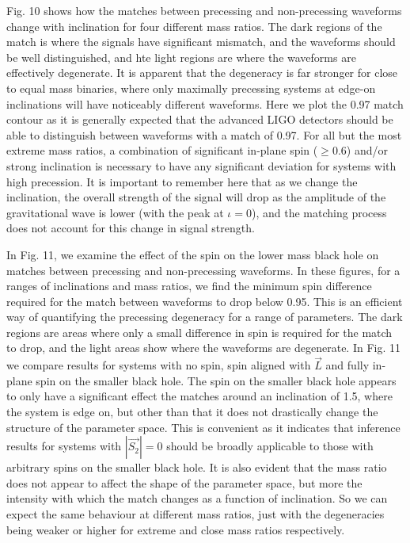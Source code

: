 \documentclass[11pt]{article}
\begin{document}
Fig. 10 shows how the matches between precessing and non-precessing waveforms change with inclination for four different mass ratios. The dark regions of the match is where the signals have significant mismatch, and the waveforms should be well distinguished, and hte light regions are where the waveforms are effectively degenerate. It is apparent that the degeneracy is far stronger for close to equal mass binaries, where only maximally precessing systems at edge-on inclinations will have noticeably different waveforms. Here we plot the 0.97 match contour as it is generally expected that the advanced LIGO detectors should be able to distinguish between waveforms with a match of 0.97. For all but the most extreme mass ratios, a combination of significant in-plane spin ($\geq0.6$) and/or strong inclination is necessary to have any significant deviation for systems with high precession. It is important to remember here that as we change the inclination, the overall strength of the signal will drop as the amplitude of the gravitational wave is lower (with the peak at $\iota=0$), and the matching process does not account for this change in signal strength.

In Fig. 11, we examine the effect of the spin on the lower mass black hole on matches between precessing and non-precessing waveforms. In these figures, for a ranges of inclinations and mass ratios, we find the minimum spin difference required for the match between waveforms to drop below 0.95. This is an efficient way of quantifying the precessing degeneracy for a range of parameters. The dark regions are areas where only a small difference in spin is required for the match to drop, and the light areas show where the waveforms are degenerate. In Fig. 11 we compare results for systems with no spin, spin aligned with $\vec{L}$ and fully in-plane spin on the smaller black hole. The spin on the smaller black hole appears to only have a significant effect the matches around an inclination of 1.5, where the system is edge on, but other than that it does not drastically change the structure of the parameter space. This is convenient as it indicates that inference results for systems with $|\vec{S_2}|=0$ should be broadly applicable to those with arbitrary spins on the smaller black hole. It is also evident that the mass ratio does not appear to affect the shape of the parameter space, but more the intensity with which the match changes as a function of inclination. So we can expect the same behaviour at different mass ratios, just with the degeneracies being weaker or higher for extreme and close mass ratios respectively.
\end{document}
